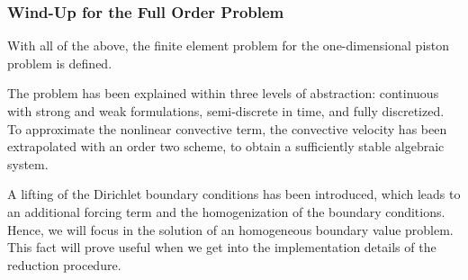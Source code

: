 \documentclass[../../thesis.tex]{subfiles}
\begin{document}
\subsubsection{Wind-Up for the Full Order Problem}
With all of the above, the finite element problem for the one-dimensional piston problem is defined.

The problem has been explained within three levels of abstraction: 
continuous with strong and weak formulations, 
semi-discrete in time, 
and fully discretized.
To approximate the nonlinear convective term, the convective velocity has been extrapolated with an order two scheme, 
to obtain a sufficiently stable algebraic system.


A lifting of the Dirichlet boundary conditions has been introduced, 
which leads to an additional forcing term and the homogenization of the boundary conditions.
Hence, we will focus in the solution of an homogeneous boundary value problem.
This fact will prove useful when we get into 
the implementation details of the reduction procedure.
\end{document}
